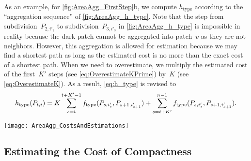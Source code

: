 As an example, for \fig\ref{fig:AreaAgg_FirstStep}b, we compute 
$h_\mathrm{type}$ 
according to the ``aggregation sequence'' of 
\fig\ref{fig:AreaAgg_h_type}.
Note that the step from
subdivision~$P_{2,i'_2}$ to subdivision~$P_{3,i'_3}$ 
in \fig\ref{fig:AreaAgg_h_type} is impossible in reality 
because the dark patch cannot be aggregated into patch~$v$
as they are not neighbors. 
However, this aggregation is allowed for estimation 
because we may find a shortest path as long as 
the estimated cost is no more than 
the exact cost of a shortest path.
When we need to overestimate, we multiply the estimated cost of the 
first~$K'$ steps (see \eq\ref{eq:OverestimateKPrime}) 
by~$K$ (see \eq\ref{eq:OverestimateK}).
As a result, \fo\ref{eq:h_type} is revised to
\begin{equation}
\label{eq:o_type}
h_\mathrm{type}(P_{t,i})=
K\sum_{s=t}^{t+K'-1}f_\mathrm{type}(P_{s,i'_s},P_{s+1,i'_{s+1}})+
\sum_{s=t+K'}^{n-1}f_\mathrm{type}(P_{s,i'_s},P_{s+1,i'_{s+1}}).
\end{equation}


\begin{figure*}[tb]
\centering
\texttt{[image: AreaAgg\_CostsAndEstimations]}
\caption{An ``aggregation sequence'' for computing
    the estimated cost of type change~$h_{\mathrm{type}}$
    (see \eqs\ref{eq:h_type} and~\ref{eq:o_type}),
	based on the aggregation result of 
	\fig\ref{fig:AreaAgg_FirstStep}b.
    Note that this aggregation sequence is impossible in reality,
    but it is fine for estimating
    (see the argument in \sect\ref{sec:AreaAgg_h_type}).}
\label{fig:AreaAgg_h_type}
\end{figure*}


\subsection{Estimating the Cost of Compactness}
\label{sec:AreaAgg_h_comp}

